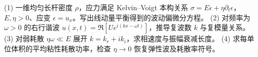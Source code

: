 (1) 一维均匀长杆密度 \(\rho\)，应力满足 Kelvin–Voigt 本构关系 \(\sigma=E\epsilon+\eta\partial_t\epsilon\)，\(E,\eta>0\)、应变 \(\epsilon=u_x\)。写出线动量平衡得到的波动偏微分方程。
(2) 对频率为 \(\omega>0\) 的右行谐波 \(u(x,t)=\Re[Ue^{i(kx-\omega t)}]\)，推导复波数 \(k\) 与复模量关系。
(3) 对弱耗散 \(\eta\omega\ll E\) 展开 \(k=k_r+ik_i\)，求相速度与振幅衰减长度。
(4) 求每单位体积的平均粘性耗散功率，检查 \(\eta\to0\) 恢复弹性波及耗散率符号。
